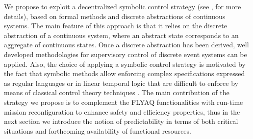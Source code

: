 \documentclass[letterpaper, 10 pt, conference]{ieeeconf}
\begin{document}
We propose to exploit a decentralized symbolic control strategy (see \cite{Pola:TAC2016}, \cite{Pola:Decentralized} for more details), based on formal methods and discrete abstractions of continuous systems. 
The main feature of this approach is that it relies on the discrete abstraction of a continuous system, where an abstract state corresponds to an aggregate of continuous states. Once a discrete abstraction has been derived, well developed methodologies for supervisory control of discrete event systems can be applied.
Also, the choice of applying a symbolic control strategy is motivated by the fact that symbolic methods allow  enforcing complex specifications expressed as regular languages or in linear temporal logic that are difficult to enforce by means of classical control theory techniques \cite{Pola:Decentralized}. 
%
The main contribution of the strategy we propose is to complement the FLYAQ functionalities with run-time mission reconfiguration to enhance safety and efficiency properties, thus in the next section we introduce the notion of predictability in terms of both critical situations and forthcoming availability of functional resources.
\end{document}
